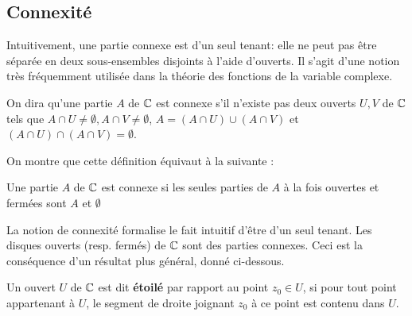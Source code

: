 \subsection{Connexité}
Intuitivement, une partie connexe est d'un seul tenant: elle ne peut pas être séparée en deux sous-ensembles disjoints à l'aide d'ouverts. Il s'agit d'une notion très fréquemment utilisée dans la théorie des fonctions de la variable complexe. 
\begin{fdefn}
On dira qu'une partie $A$ de $\mathbb{C}$ est connexe s'il n'existe pas deux ouverts $U,V$ de $\mathbb{C}$ tels que $A\cap U \neq \emptyset, A \cap V \neq \emptyset$, $A = (A \cap U) \cup (A \cap V)$ et $(A\cap U)\cap(A \cap V) = \emptyset$.
\end{fdefn}
On montre que cette définition équivaut à la suivante :

\begin{fdefn}
Une partie $A$ de $\mathbb{C}$ est connexe si les seules parties de $A$ à la fois ouvertes et fermées sont $A$ et $\emptyset$
\end{fdefn}

La notion de connexité formalise le fait intuitif d'être d'un seul tenant. Les disques ouverts (resp. fermés) de $\mathbb{C}$ sont des parties connexes. Ceci est la conséquence d'un résultat plus général, donné ci-dessous. 
\begin{fdefn} Un ouvert $U$ de $\mathbb{C}$ est dit \textbf{étoilé} par rapport au point $z_0 \in U$, si pour tout point appartenant à  $U$, le segment de droite joignant $z_0$ à ce point est contenu dans $U$. 
\end{fdefn}


